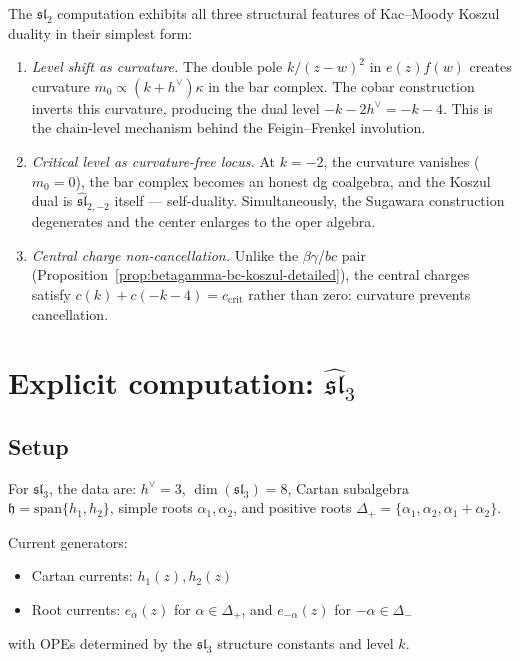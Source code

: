 \begin{remark}\label{rem:sl2-portrait}
The $\mathfrak{sl}_2$ computation exhibits all three structural features of Kac--Moody Koszul duality in their simplest form:
\begin{enumerate}
\item \emph{Level shift as curvature.}  The double pole $k/(z-w)^2$ in $e(z)f(w)$ creates curvature $m_0 \propto (k+h^\vee)\kappa$ in the bar complex.  The cobar construction inverts this curvature, producing the dual level $-k-2h^\vee = -k-4$.  This is the chain-level mechanism behind the Feigin--Frenkel involution.
\item \emph{Critical level as curvature-free locus.}  At $k=-2$, the curvature vanishes ($m_0 = 0$), the bar complex becomes an honest dg coalgebra, and the Koszul dual is $\widehat{\mathfrak{sl}}_{2,-2}$ itself --- self-duality.  Simultaneously, the Sugawara construction degenerates and the center enlarges to the oper algebra.
\item \emph{Central charge non-cancellation.}  Unlike the $\beta\gamma$/$bc$ pair (Proposition~\ref{prop:betagamma-bc-koszul-detailed}), the central charges satisfy $c(k) + c(-k-4) = c_{\mathrm{crit}}$ rather than zero: curvature prevents cancellation.
\end{enumerate}
\end{remark}

\section{\texorpdfstring{Explicit computation: $\widehat{\mathfrak{sl}}_3$}{Explicit computation: sl-3}}
\label{sec:sl3-computation}

\subsection{Setup}

For $\mathfrak{sl}_3$, the data are: $h^\vee = 3$, $\dim(\mathfrak{sl}_3) = 8$, Cartan subalgebra $\mathfrak{h} = \mathrm{span}\{h_1, h_2\}$, simple roots $\alpha_1, \alpha_2$, and positive roots $\Delta_+ = \{\alpha_1, \alpha_2, \alpha_1+\alpha_2\}$.

\begin{definition}
Current generators:
\begin{itemize}
\item Cartan currents: $h_1(z), h_2(z)$
\item Root currents: $e_{\alpha}(z)$ for $\alpha \in \Delta_+$, and $e_{-\alpha}(z)$ for $-\alpha \in \Delta_-$
\end{itemize}
with OPEs determined by the $\mathfrak{sl}_3$ structure constants and level $k$.
\end{definition}

